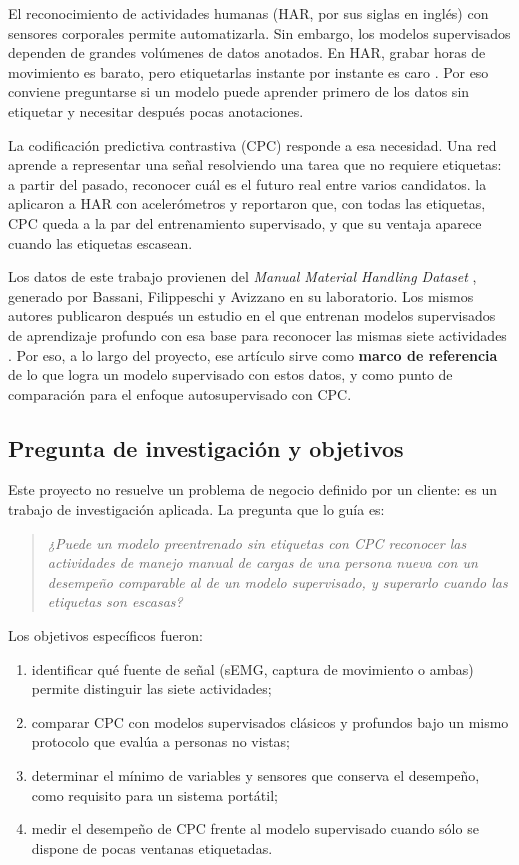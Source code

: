 \documentclass[letterpaper,11pt]{article}
\begin{document}
El reconocimiento de actividades humanas (HAR, por sus siglas en inglés) con sensores corporales permite automatizarla. Sin embargo, los modelos supervisados dependen de grandes volúmenes de datos anotados. En HAR, grabar horas de movimiento es barato, pero etiquetarlas instante por instante es caro \parencite{haresamudram2021}. Por eso conviene preguntarse si un modelo puede aprender primero de los datos sin etiquetar y necesitar después pocas anotaciones.

La codificación predictiva contrastiva (CPC) \parencite{vandenoord2018} responde a esa necesidad. Una red aprende a representar una señal resolviendo una tarea que no requiere etiquetas: a partir del pasado, reconocer cuál es el futuro real entre varios candidatos. \textcite{haresamudram2021} la aplicaron a HAR con acelerómetros y reportaron que, con todas las etiquetas, CPC queda a la par del entrenamiento supervisado, y que su ventaja aparece cuando las etiquetas escasean.

Los datos de este trabajo provienen del \emph{Manual Material Handling Dataset} \parencite{bassani2021dataset}, generado por Bassani, Filippeschi y Avizzano en su laboratorio. Los mismos autores publicaron después un estudio en el que entrenan modelos supervisados de aprendizaje profundo con esa base para reconocer las mismas siete actividades \parencite{bassani2025}. Por eso, a lo largo del proyecto, ese artículo sirve como \textbf{marco de referencia} de lo que logra un modelo supervisado con estos datos, y como punto de comparación para el enfoque autosupervisado con CPC.

\subsection{Pregunta de investigación y objetivos}
Este proyecto no resuelve un problema de negocio definido por un cliente: es un trabajo de investigación aplicada. La pregunta que lo guía es:

\begin{quote}
\emph{¿Puede un modelo preentrenado sin etiquetas con CPC reconocer las actividades de manejo manual de cargas de una persona nueva con un desempeño comparable al de un modelo supervisado, y superarlo cuando las etiquetas son escasas?}
\end{quote}

\noindent Los objetivos específicos fueron:
\begin{enumerate}
  \item identificar qué fuente de señal (sEMG, captura de movimiento o ambas) permite distinguir las siete actividades;
  \item comparar CPC con modelos supervisados clásicos y profundos bajo un mismo protocolo que evalúa a personas no vistas;
  \item determinar el mínimo de variables y sensores que conserva el desempeño, como requisito para un sistema portátil;
  \item medir el desempeño de CPC frente al modelo supervisado cuando sólo se dispone de pocas ventanas etiquetadas.
\end{enumerate}
\end{document}
